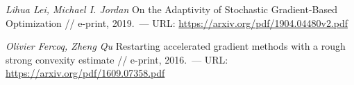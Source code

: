 \documentclass{crm-article}
\begin{document}
\begin{thebibliography}{99}

	\textit{Lihua Lei, Michael I. Jordan} On the Adaptivity of Stochastic Gradient-Based
  Optimization // e-print, 2019.~--- URL: \url{https://arxiv.org/pdf/1904.04480v2.pdf}

	\textit{Olivier Fercoq, Zheng Qu} Restarting accelerated gradient methods with a rough strong convexity estimate // e-print, 2016.~--- URL: \url{https://arxiv.org/pdf/1609.07358.pdf}


\end{thebibliography}
\end{document}
